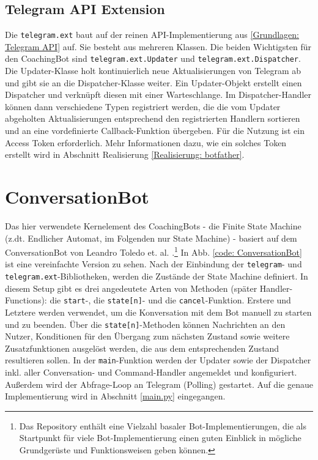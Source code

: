         \subsection{Telegram API Extension}\label{Grundlagen: Telegram API Ext}
            Die \verb|telegram.ext| baut auf der reinen API-Implementierung aus \ref{Grundlagen: Telegram API} auf. Sie besteht aus mehreren Klassen. Die beiden Wichtigsten für den CoachingBot sind \verb|telegram.ext.Updater| und \verb|telegram.ext.Dispatcher|. Die Updater-Klasse holt kontinuierlich neue Aktualisierungen von Telegram ab und gibt sie an die Dispatcher-Klasse weiter. Ein Updater-Objekt erstellt einen Dispatcher und verknüpft diesen mit einer Warteschlange. Im Dispatcher-Handler können dann verschiedene Typen registriert werden, die die vom Updater abgeholten Aktualisierungen entsprechend den registrierten Handlern sortieren und an eine vordefinierte Callback-Funktion übergeben. Für die Nutzung ist ein Access Token erforderlich.\cite{telegram_ext_intro} Mehr Informationen dazu, wie ein solches Token erstellt wird in Abschnitt Realisierung \ref{Realisierung: botfather}.


    \section{ConversationBot}
        Das hier verwendete Kernelement des CoachingBots - die Finite State Machine (z.dt. Endlicher Automat, im Folgenden nur \glqq State Machine\grqq) - basiert auf dem ConversationBot von Leandro Toledo et. al. \cite{conversationBot}.\footnote{Das Repository enthält eine Vielzahl basaler Bot-Implementierungen, die als Startpunkt für viele Bot-Implementierung einen guten Einblick in mögliche Grundgerüste und Funktionsweisen geben können.} In Abb. \ref{code: ConversationBot} ist eine vereinfachte Version zu sehen. Nach der Einbindung der \verb|telegram|- und \verb|telegram.ext|-Bibliotheken, werden die Zustände der State Machine definiert. In diesem Setup gibt es drei angedeutete Arten von Methoden (später Handler-Functions): die \verb|start|-, die \verb|state[n]|- und die \verb|cancel|-Funktion. Erstere und Letztere werden verwendet, um die Konversation mit dem Bot manuell zu starten und zu beenden. Über die \verb|state[n]|-Methoden können Nachrichten an den Nutzer, Konditionen für den Übergang zum nächsten Zustand sowie weitere Zusatzfunktionen ausgelöst werden, die aus dem entsprechenden Zustand resultieren sollen. 
        In der \verb|main|-Funktion werden der Updater sowie der Dispatcher inkl. aller Conversation- und Command-Handler angemeldet und konfiguriert. Außerdem wird der Abfrage-Loop an Telegram (Polling) gestartet. Auf die genaue Implementierung wird in Abschnitt \ref{main.py} eingegangen.
        
